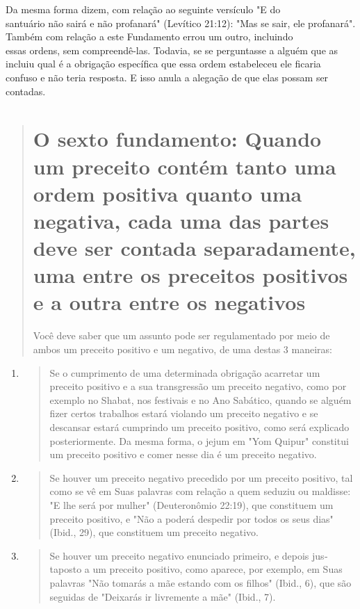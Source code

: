Da mesma forma dizem, com relação ao seguinte versículo "E do\\
santuário não sairá e não profanará" (Levítico 21:12): "Mas se sair, ele
profanará".\\
Também com relação a este Fundamento errou um outro, incluindo\\
essas ordens, sem compreendê-las. Todavia, se se perguntasse a alguém
que as\\
incluiu qual é a obrigação específica que essa ordem estabeleceu ele
ficaria confuso
e não teria resposta. E isso anula a alegação de que elas possam
ser contadas.

\begin{quote}

\chapter{O sexto fundamento: Quando um preceito 
contém tanto uma ordem positiva quanto uma negativa,
cada uma das partes deve ser contada separadamente, uma entre os
preceitos positivos e a outra entre os negativos}

Você deve saber que um assunto pode ser regulamentado por meio de ambos
um preceito positivo e um negativo, de uma destas 3 maneiras:
\end{quote}

\begin{enumerate}
\def\labelenumi{\arabic{enumi}.}
\item
 \begin{quote}
 Se o cumprimento de uma determinada obrigação acarretar um preceito
 positivo e a sua transgressão um preceito negativo, como por exem­plo
 no Shabat, nos festivais e no Ano Sabático, quando se alguém fizer
 certos trabalhos estará violando um preceito negativo e se descansar
 estará cumprin­do um preceito positivo, como será explicado
 posteriormente. Da mesma for­ma, o jejum em "Yom Quipur" constitui um
 preceito positivo e comer nesse dia é um preceito negativo.
 \end{quote}
\item
 \begin{quote}
 Se houver um preceito negativo precedido por um preceito posi­tivo,
 tal como se vê em Suas palavras com relação a quem seduziu ou
 maldisse: "E lhe será por mulher" (Deuteronômio 22:19), que constituem
 um preceito positivo, e "Não a poderá despedir por todos os seus dias"
 (Ibid., 29), que cons­tituem um preceito negativo.
 \end{quote}
\item
 \begin{quote}
 Se houver um preceito negativo enunciado primeiro, e depois
 jus­taposto a um preceito positivo, como aparece, por exemplo, em Suas
 palavras "Não tomarás a mãe estando com os filhos" (Ibid., 6), que são
 seguidas de "Dei­xarás ir livremente a mãe" (Ibid., 7).
 \end{quote}
\end{enumerate}


